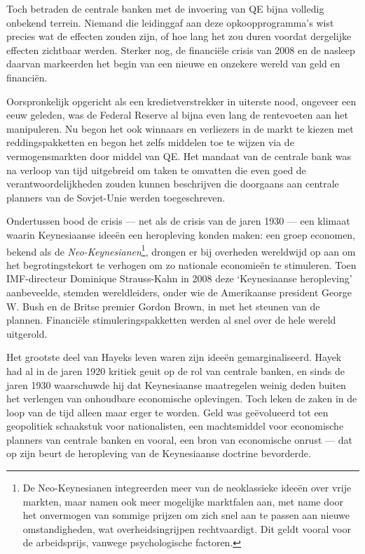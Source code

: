 \documentclass[
  a5paper,
  smalldemyvopaper,11pt,twoside,onecolumn,openright,extrafontsizes,
hidelinks]{memoir}
\begin{document}
Toch betraden de centrale banken met de invoering van QE bijna volledig
onbekend terrein. Niemand die leidinggaf aan deze opkoopprogramma's wist
precies wat de effecten zouden zijn, of hoe lang het zou duren voordat
dergelijke effecten zichtbaar werden. Sterker nog, de financiële crisis
van 2008 en de nasleep daarvan markeerden het begin van een nieuwe en
onzekere wereld van geld en financiën.

Oorspronkelijk opgericht als een kredietverstrekker in uiterste nood,
ongeveer een eeuw geleden, was de Federal Reserve al bijna even lang de
rentevoeten aan het manipuleren. Nu begon het ook winnaars en verliezers
in de markt te kiezen met reddingspakketten en begon het zelfs middelen
toe te wijzen via de vermogensmarkten door middel van QE. Het mandaat
van de centrale bank was na verloop van tijd uitgebreid om taken te
omvatten die even goed de verantwoordelijkheden zouden kunnen
beschrijven die doorgaans aan centrale planners van de Sovjet-Unie
werden toegeschreven.

Ondertussen bood de crisis --- net als de crisis van de jaren 1930 ---
een klimaat waarin Keynesiaanse ideeën een heropleving konden maken: een
groep economen, bekend als de \emph{Neo-Keynesianen}\footnote{De
  Neo-Keynesianen integreerden meer van de neoklassieke ideeën over
  vrije markten, maar namen ook meer mogelijke marktfalen aan, met name
  door het onvermogen van sommige prijzen om zich snel aan te passen aan
  nieuwe omstandigheden, wat overheidsingrijpen rechtvaardigt. Dit geldt
  vooral voor de arbeidsprijs, vanwege psychologische factoren.},
drongen er bij overheden wereldwijd op aan om het begrotingstekort te
verhogen om zo nationale economieën te stimuleren. Toen IMF-directeur
Dominique Strauss-Kahn in 2008 deze `Keynesiaanse heropleving'
aanbeveelde, stemden wereldleiders, onder wie de Amerikaanse president
George W. Bush en de Britse premier Gordon Brown, in met het steunen van
de plannen. Financiële stimuleringspakketten werden al snel over de hele
wereld uitgerold.

Het grootste deel van Hayeks leven waren zijn ideeën gemarginaliseerd.
Hayek had al in de jaren 1920 kritiek geuit op de rol van centrale
banken, en sinds de jaren 1930 waarschuwde hij dat Keynesiaanse
maatregelen weinig deden buiten het verlengen van onhoudbare economische
oplevingen. Toch leken de zaken in de loop van de tijd alleen maar erger
te worden. Geld was geëvolueerd tot een geopolitiek schaakstuk voor
nationalisten, een machtsmiddel voor economische planners van centrale
banken en vooral, een bron van economische onrust --- dat op zijn beurt
de heropleving van de Keynesiaanse doctrine bevorderde.
\end{document}
